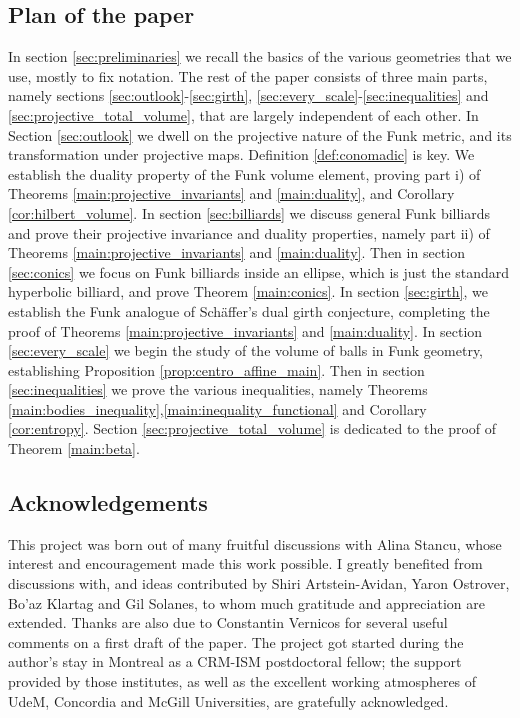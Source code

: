 \documentclass[reqno,10pt]{amsart}
\newcounter{mp}
\begin{document}
\subsection{Plan of the paper}
In section \ref{sec:preliminaries} we recall the basics of the various geometries that we use, mostly to fix notation. The rest of the paper consists of three main parts, namely sections \ref{sec:outlook}-\ref{sec:girth}, \ref{sec:every_scale}-\ref{sec:inequalities} and \ref{sec:projective_total_volume}, that are largely independent of each other. In Section \ref{sec:outlook} we dwell on the projective nature of the Funk metric, and its transformation under projective maps. Definition \ref{def:conomadic} is key. We establish the duality property of the Funk volume element, proving part i) of Theorems \ref{main:projective_invariants} and \ref{main:duality}, and Corollary \ref{cor:hilbert_volume}. In section \ref{sec:billiards} we discuss general Funk billiards and prove their projective invariance and duality properties, namely part ii) of Theorems  \ref{main:projective_invariants} and \ref{main:duality}. Then in section \ref{sec:conics} we focus on Funk billiards inside an ellipse, which is just the standard hyperbolic billiard, and prove Theorem \ref{main:conics}. In section \ref{sec:girth}, we establish the Funk analogue of Sch\"affer's dual girth conjecture, completing the proof of Theorems  \ref{main:projective_invariants} and \ref{main:duality}. In section \ref{sec:every_scale} we begin the study of the volume of balls in Funk geometry, establishing Proposition \ref{prop:centro_affine_main}. Then in section \ref{sec:inequalities} we prove the various inequalities, namely Theorems \ref{main:bodies_inequality},\ref{main:inequality_functional} and Corollary \ref{cor:entropy}. Section \ref{sec:projective_total_volume} is dedicated to the proof of Theorem \ref{main:beta}. 



\subsection{Acknowledgements}
This project was born out of many fruitful discussions with Alina Stancu, whose interest and encouragement made this work possible. I greatly benefited from discussions with, and ideas contributed by Shiri Artstein-Avidan, Yaron Ostrover, Bo'az Klartag and Gil Solanes, to whom much gratitude and appreciation are extended. Thanks are also due to Constantin Vernicos for several useful comments on a first draft of the paper. The project got started during the author's stay in Montreal as a CRM-ISM postdoctoral fellow; the support provided by those institutes, as well as the excellent working atmospheres of UdeM, Concordia and McGill Universities, are gratefully acknowledged.
\end{document}
